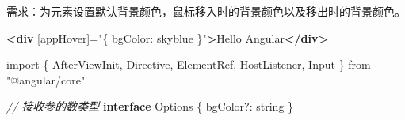 \documentclass[
]{article}
\newenvironment{Shaded}{}{}
\newcommand{\CommentTok}[1]{\textcolor[rgb]{0.38,0.63,0.69}{\textit{#1}}}
\newcommand{\ImportTok}[1]{#1}
\newcommand{\KeywordTok}[1]{\textcolor[rgb]{0.00,0.44,0.13}{\textbf{#1}}}
\newcommand{\NormalTok}[1]{#1}
\newcommand{\OperatorTok}[1]{\textcolor[rgb]{0.40,0.40,0.40}{#1}}
\newcommand{\OtherTok}[1]{\textcolor[rgb]{0.00,0.44,0.13}{#1}}
\newcommand{\StringTok}[1]{\textcolor[rgb]{0.25,0.44,0.63}{#1}}
\begin{document}
需求：为元素设置默认背景颜色，鼠标移入时的背景颜色以及移出时的背景颜色。

\begin{Shaded}
\begin{Highlighting}[]
\KeywordTok{\textless{}div}\OtherTok{ [appHover]=}\StringTok{"\{ bgColor: \textquotesingle{}skyblue\textquotesingle{} \}"}\KeywordTok{\textgreater{}}\NormalTok{Hello Angular}\KeywordTok{\textless{}/div\textgreater{}}
\end{Highlighting}
\end{Shaded}

\begin{Shaded}
\begin{Highlighting}[]
\ImportTok{import}\NormalTok{ \{ AfterViewInit}\OperatorTok{,}\NormalTok{ Directive}\OperatorTok{,}\NormalTok{ ElementRef}\OperatorTok{,}\NormalTok{ HostListener}\OperatorTok{,}\NormalTok{ Input \} }\ImportTok{from} \StringTok{"@angular/core"}

\CommentTok{// 接收参的数类型}
\KeywordTok{interface}\NormalTok{ Options \{}
\NormalTok{  bgColor}\OperatorTok{?:}\NormalTok{ string}
\NormalTok{\}}


\end{Highlighting}
\end{Shaded}
\end{document}
